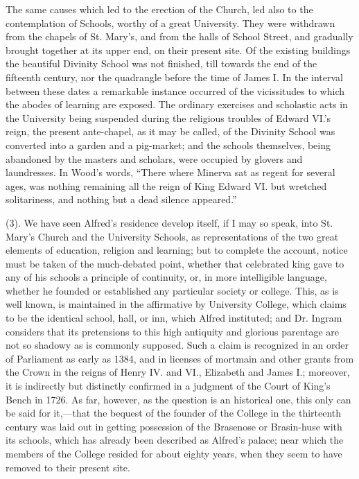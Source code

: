 The same causes which led to
the erection of the Church, led also to the contemplation of Schools,
worthy of a great University. They were withdrawn from the chapels of
St. Mary's, and from the halls of School Street, and gradually brought
together at its upper end, on their present site. Of the existing
buildings the beautiful Divinity School was not finished, till towards
the end of the fifteenth century, nor the quadrangle before the time
of James I. In the interval between these dates a remarkable instance
occurred of the vicissitudes to which the abodes of learning are
exposed. The ordinary exercises and scholastic acts in the University
being suspended during the religious troubles of Edward VI.'s reign,
the present ante-chapel, as it may be called, of the Divinity School
was converted into a garden and a pig-market; and the schools
themselves, being abandoned by the masters and scholars, were occupied
by glovers and laundresses. In Wood's words, ``There where Minerva sat
as regent for several ages, was nothing remaining all the reign of
King Edward VI. but wretched solitariness, and nothing but a dead
silence appeared.''

(3). We have seen Alfred's
residence develop itself, if I may so speak, into St. Mary's Church
and the University Schools, as representations of the two great
elements of education, religion and learning; but to complete the
account, notice must be taken of the much-debated point, whether that
celebrated king gave to any of his schools a principle of continuity,
or, in more intelligible language, whether he founded or established
any particular society or college. This, as is well known, is
maintained in the affirmative by University College, which claims to
be the identical school, hall, or inn, which Alfred instituted; and
Dr. Ingram considers that its pretensions to this high antiquity and
glorious parentage are not so shadowy as is commonly supposed. Such a
claim is recognized in an order of Parliament as early as 1384, and in
licenses of mortmain and other grants from the Crown in the reigns of
Henry IV. and VI., Elizabeth and James I.; moreover, it is indirectly
but distinctly confirmed in a judgment of the Court of King's Bench in
1726. As far, however, as the question is an historical one, this only
can be said for it,—that the bequest of the founder of the College
in the thirteenth century was laid out in getting possession of the
Brasenose or Brasin-huse with its schools, which has already been
described as Alfred's palace; near which the members of the College
resided for about eighty years, when they seem to have removed to
their present site.

